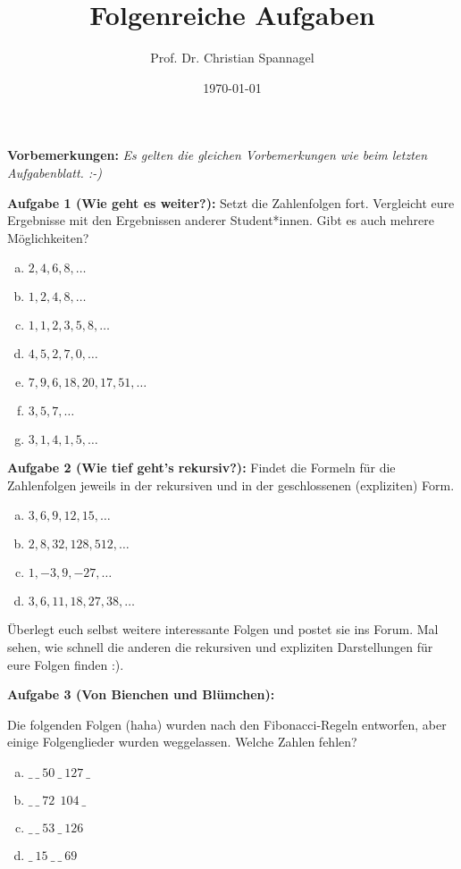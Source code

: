 \documentclass{../cssheet}
\title{Folgenreiche Aufgaben}
\author{Prof. Dr. Christian Spannagel}
\date{\today}
\begin{document}
\printtitle

\vspace*{10mm}

\textbf{Vorbemerkungen:} 
\emph{Es gelten die gleichen Vorbemerkungen wie beim letzten Aufgabenblatt. :-)}

\textbf{Aufgabe 1 (Wie geht es weiter?):}  Setzt die Zahlenfolgen fort. Vergleicht eure Ergebnisse mit
den Ergebnissen anderer Student*innen. Gibt es auch mehrere Möglichkeiten?
\begin{enumerate}[a)]
\item $2, 4, 6, 8, \ldots$
\item $1, 2, 4, 8, \ldots$
\item $1, 1, 2, 3, 5, 8, \ldots$
\item $4, 5, 2, 7, 0, \ldots$
\item $7, 9, 6, 18, 20, 17, 51, \ldots$
\item $3, 5, 7, \ldots$
\item $3, 1, 4, 1, 5, \ldots$
\end{enumerate}



\textbf{Aufgabe 2 (Wie tief geht's rekursiv?):}  Findet die Formeln für die Zahlenfolgen jeweils in der
rekursiven und in der geschlossenen (expliziten) Form. 

\begin{enumerate}[a)]
\item $3, 6, 9, 12, 15, \ldots$
\item $2, 8, 32, 128, 512, \ldots$
\item $1, -3, 9, -27, \ldots$
\item $3, 6, 11, 18, 27, 38, \ldots$
\end{enumerate}

Überlegt euch selbst weitere interessante Folgen und postet sie ins Forum. Mal sehen, wie schnell die anderen die rekursiven und expliziten Darstellungen für eure Folgen finden :).

\textbf{Aufgabe 3 (Von Bienchen und Blümchen):} 

Die folgenden Folgen (haha) wurden nach den Fibonacci-Regeln entworfen, aber einige Folgenglieder wurden weggelassen. Welche Zahlen fehlen?
\begin{enumerate}[a)]
\item $\_\  \_\  50\  \_\  127\  \_$
\item $\_\  \_\  72\ \ 104\  \_$
\item $\_\  \_\  53\  \_\  126$
\item $\_\ 15\  \_\  \_\  69$
\end{enumerate}

\newpage
\printlicense

\printsocials
\end{document}
